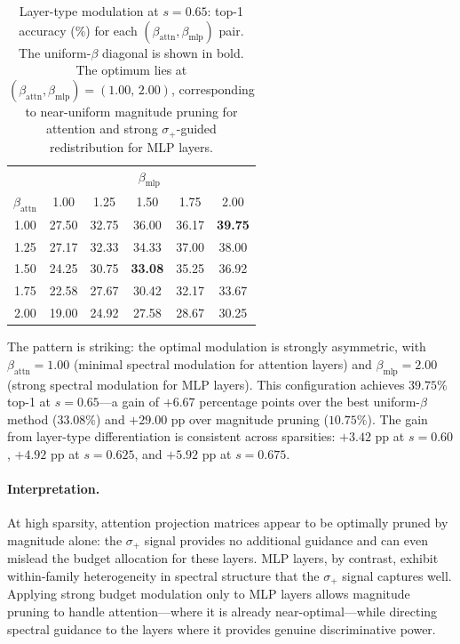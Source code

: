 \documentclass[11pt]{article}
\theoremstyle{plain}
\theoremstyle{definition}
\theoremstyle{remark}
\newcommand{\1}{\mathbf{1}}
\begin{document}
\begin{table}[ht]
\centering
\caption{Layer-type modulation at \(s=0.65\): top-1 accuracy (\%) for each \((\beta_{\mathrm{attn}}, \beta_{\mathrm{mlp}})\) pair.  The uniform-\(\beta\) diagonal is shown in bold.  The optimum lies at \((\beta_{\mathrm{attn}},\beta_{\mathrm{mlp}})=(1.00,\,2.00)\), corresponding to near-uniform magnitude pruning for attention and strong \(\sigma_+\)-guided redistribution for MLP layers.}
\label{tab:splus_layertype}
\begin{tabular}{c|ccccc}
\toprule
 & \multicolumn{5}{c}{\(\beta_{\mathrm{mlp}}\)} \\
\(\beta_{\mathrm{attn}}\) & 1.00 & 1.25 & 1.50 & 1.75 & 2.00 \\
\midrule
1.00 & 27.50 & 32.75 & 36.00 & 36.17 & \textbf{39.75} \\
1.25 & 27.17 & 32.33 & 34.33 & 37.00 & 38.00 \\
1.50 & 24.25 & 30.75 & \textbf{33.08} & 35.25 & 36.92 \\
1.75 & 22.58 & 27.67 & 30.42 & 32.17 & 33.67 \\
2.00 & 19.00 & 24.92 & 27.58 & 28.67 & 30.25 \\
\bottomrule
\end{tabular}
\end{table}

The pattern is striking: the optimal modulation is strongly asymmetric, with \(\beta_{\mathrm{attn}}=1.00\) (minimal spectral modulation for attention layers) and \(\beta_{\mathrm{mlp}}=2.00\) (strong spectral modulation for MLP layers).  This configuration achieves \(39.75\%\) top-1 at \(s=0.65\)---a gain of \(+6.67\) percentage points over the best uniform-\(\beta\) method (\(33.08\%\)) and \(+29.00\) pp over magnitude pruning (\(10.75\%\)).  The gain from layer-type differentiation is consistent across sparsities: \(+3.42\) pp at \(s=0.60\), \(+4.92\) pp at \(s=0.625\), and \(+5.92\) pp at \(s=0.675\).

\paragraph{Interpretation.}
At high sparsity, attention projection matrices appear to be optimally pruned by magnitude alone: the \(\sigma_+\) signal provides no additional guidance and can even mislead the budget allocation for these layers.  MLP layers, by contrast, exhibit within-family heterogeneity in spectral structure that the \(\sigma_+\) signal captures well.  Applying strong budget modulation only to MLP layers allows magnitude pruning to handle attention---where it is already near-optimal---while directing spectral guidance to the layers where it provides genuine discriminative power.
\end{document}
